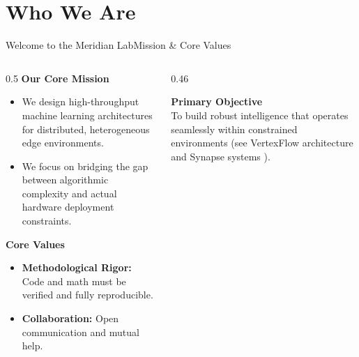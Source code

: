 \section{Who We Are}

\begin{frame}{Welcome to the Meridian Lab}{Mission \& Core Values}
  \begin{columns}[T]
    \begin{column}{0.5\textwidth}
      \textbf{Our Core Mission}
      \begin{itemize}
        \item We design high-throughput machine learning architectures for distributed, heterogeneous edge environments.
        \item We focus on bridging the gap between algorithmic complexity and actual hardware deployment constraints.
      \end{itemize}
      
      \vspace{0.4cm}
      \textbf{Core Values}
      \begin{itemize}
        \item \textbf{Methodological Rigor:} Code and math must be verified and fully reproducible.
        \item \textbf{Collaboration:} Open communication and mutual help.
      \end{itemize}
    \end{column}
    
    \begin{column}{0.46\textwidth}
      \begin{highlightbox}
        \textbf{Primary Objective} \\
        To build robust intelligence that operates seamlessly within constrained environments (see VertexFlow architecture \cite{meridian2025vertexflow} and Synapse systems \cite{synapse2024decentralized}).
      \end{highlightbox}
      
      \vspace{0.3cm}
      \begin{center}
      \end{center}
    \end{column}
  \end{columns}
\end{frame}

